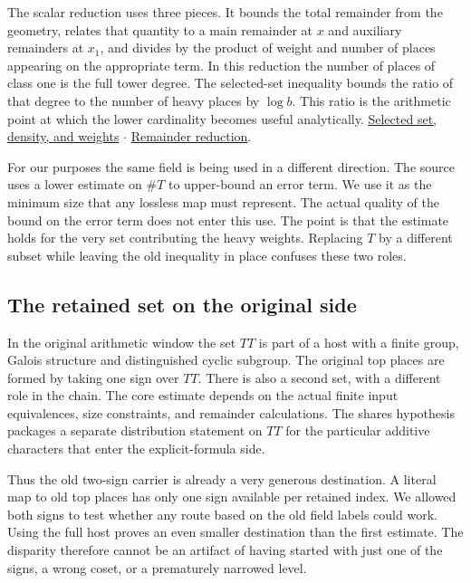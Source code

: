 \documentclass[12pt,letterpaper]{article}
\newcommand{\id}[1]{\ifmmode\text{\small\nolinkurl{#1}}\else{\small\nolinkurl{#1}}\fi}
\newcommand{\readable}[3]{\href{https://github.com/leanprover-community/riemann-hypothesis/blob/e063a923620ee7787b4a1270421478645bf66bdb/src/#1\#L#2}{#3}}
\begin{document}
The scalar reduction \id{Data.primeRemainder_le} uses three pieces. It bounds the total remainder from the geometry, relates that quantity to a main remainder at $x$ and auxiliary remainders at $x_1$, and divides by the product of weight and number of places appearing on the appropriate term. In this reduction the number of places of class one is the full tower degree. The selected-set inequality bounds the ratio of that degree to the number of heavy places by $\log b$. This ratio is the arithmetic point at which the lower cardinality becomes useful analytically. \readable{New/Reduction/Data/AdmissibleData.lean}{126}{Selected set, density, and weights} $\cdot$ \readable{New/Reduction/OneSidedBound.lean}{33}{Remainder reduction}.

For our purposes the same field is being used in a different direction. The source uses a lower estimate on $\#T$ to upper-bound an error term. We use it as the minimum size that any lossless map must represent. The actual quality of the bound on the error term does not enter this use. The point is that the estimate holds for the very set contributing the heavy weights. Replacing $T$ by a different subset while leaving the old inequality in place confuses these two roles.

\subsection{The retained set on the original side}
In the original arithmetic window the set $TT$ is part of a host with a finite group, Galois structure and distinguished cyclic subgroup. The original top places are formed by taking one sign over $TT$. There is also a second set, with a different role in the chain. The core estimate depends on the actual finite input equivalences, size constraints, and remainder calculations. The shares hypothesis packages a separate distribution statement on $TT$ for the particular additive characters that enter the explicit-formula side.

Thus the old two-sign carrier is already a very generous destination. A literal map to old top places has only one sign available per retained index. We allowed both signs to test whether any route based on the old field labels could work. Using the full host proves an even smaller destination than the first estimate. The disparity therefore cannot be an artifact of having started with just one of the signs, a wrong coset, or a prematurely narrowed level.
\end{document}
